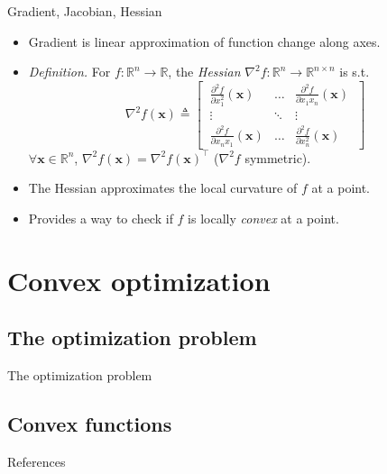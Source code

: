 \documentclass{beamer}
\numberwithin{equation}{section}
\begin{document}
\begin{frame}{Gradient, Jacobian, Hessian}
    \begin{itemize}
        \item
        Gradient is linear approximation of function change along axes.

        \item
        \textit{Definition.} For $ f : \mathbb{R}^n \rightarrow \mathbb{R} $,
        the \textit{Hessian} $ \nabla^2f : \mathbb{R}^n \rightarrow
        \mathbb{R}^{n \times n} $ is s.t.
        \begin{equation*}
            \nabla^2 f(\mathbf{x}) \triangleq \begin{bmatrix}
                \ \frac{\partial^2 f}{\partial x_1^2}(\mathbf{x}) & \ldots &
                    \frac{\partial^2 f}{\partial x_1x_n}(\mathbf{x}) \ \\
                \ \vdots & \ddots & \vdots \ \\
                \ \frac{\partial^2 f}{\partial x_nx_1}(\mathbf{x}) & \ldots &
                    \frac{\partial^2 f}{\partial x_n^2}(\mathbf{x}) \
            \end{bmatrix}
        \end{equation*}
        $ \forall \mathbf{x} \in \mathbb{R}^n $, $ \nabla^2f(\mathbf{x})
        = \nabla^2f(\mathbf{x})^\top $ ($ \nabla^2f $ symmetric).

        \item
        The Hessian approximates the local curvature of $ f $ at a point.

        \item
        Provides a way to check if $ f $ is locally \textit{convex} at a point.
    \end{itemize}
\end{frame}

\section{Convex optimization}

\subsection{The optimization problem}

\begin{frame}{The optimization problem}

\end{frame}

\subsection{Convex functions}

\begin{frame}{References}
    
    
\end{frame}
\end{document}
